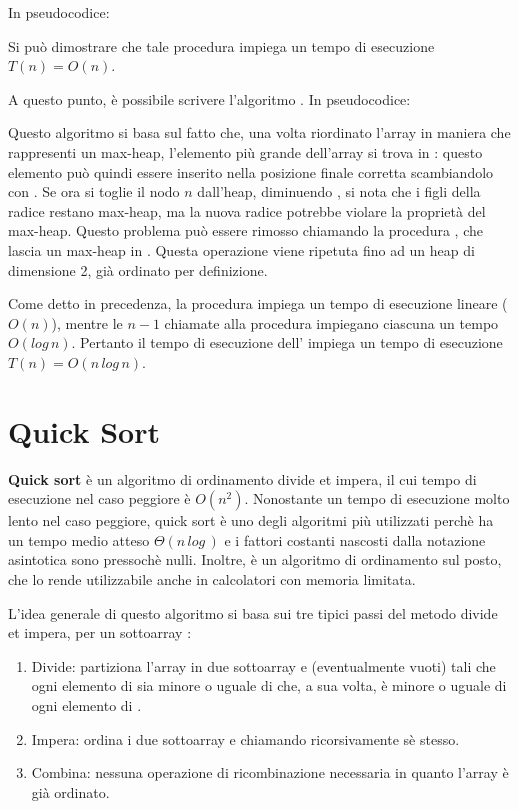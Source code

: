 In pseudocodice:


Si può dimostrare che tale procedura impiega un tempo di esecuzione \(T(n)=O(n)\).

\vspace*{10pt}

A questo punto, è possibile scrivere l'algoritmo . In pseudocodice:



Questo algoritmo si basa sul fatto che, una volta riordinato l'array in maniera che rappresenti un max-heap, l'elemento più grande dell'array si trova in : questo elemento può quindi essere inserito nella posizione finale corretta scambiandolo con . Se ora si toglie il nodo \(n\) dall'heap, diminuendo , si nota che i figli della radice restano max-heap, ma la nuova radice potrebbe violare la proprietà del max-heap. Questo problema può essere rimosso chiamando la procedura , che lascia un max-heap in . Questa operazione viene ripetuta fino ad un heap di dimensione 2, già ordinato per definizione. 

Come detto in precedenza, la procedura  impiega un tempo di esecuzione lineare (\(O(n)\)), mentre le \(n-1\) chiamate alla procedura  impiegano ciascuna un tempo \(O(log\,n)\). Pertanto il tempo di esecuzione dell' impiega un tempo di esecuzione \(T(n)=O(n\,log\,n)\).

\section{Quick Sort}
\textbf{Quick sort} è un algoritmo di ordinamento divide et impera, il cui tempo di esecuzione nel caso peggiore è \(O(n^2)\). Nonostante un tempo di esecuzione molto lento nel caso peggiore, quick sort è uno degli algoritmi più utilizzati perchè ha un tempo medio atteso \(\Theta(n\,log\,)\) e i fattori costanti nascosti dalla notazione asintotica sono pressochè nulli. Inoltre, è un algoritmo di ordinamento sul posto, che lo rende utilizzabile anche in calcolatori con memoria limitata. 

L'idea generale di questo algoritmo si basa sui tre tipici passi del metodo divide et impera, per un sottoarray :
\begin{enumerate}
  \item Divide: partiziona l'array  in due sottoarray  e  (eventualmente vuoti) tali che ogni elemento di  sia minore o uguale di  che, a sua volta, è minore o uguale di ogni elemento di .
  \item Impera: ordina i due sottoarray  e  chiamando ricorsivamente sè stesso.
  \item Combina: nessuna operazione di ricombinazione necessaria in quanto l'array  è già ordinato.
\end{enumerate}

